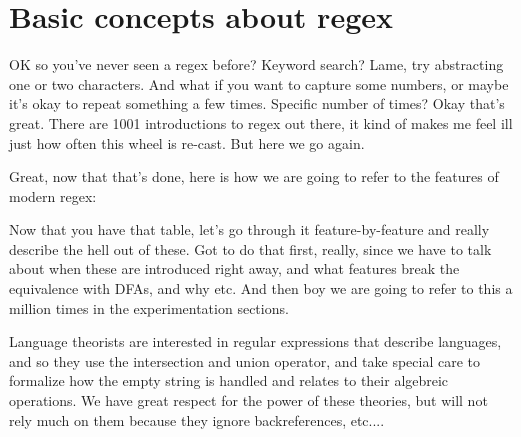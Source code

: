 \section{Basic concepts about regex}


OK so you've never seen a regex before?  Keyword search?  Lame, try abstracting one or two characters.  And what if you want to capture some numbers, or maybe it's okay to repeat something a few times.  Specific number of times?  Okay that's great.  There are 1001 introductions to regex out there, it kind of makes me feel ill just how often this wheel is re-cast. But here we go again.


Great, now that that's done, here is how we are going to refer to the features of modern regex:


Now that you have that table, let's go through it feature-by-feature and really describe the hell out of these.  Got to do that first, really, since we have to talk about when these are introduced right away, and what features break the equivalence with DFAs, and why etc.  And then boy we are going to refer to this a million times in the experimentation sections.

Language theorists are interested in regular expressions that describe languages, and so they use the intersection and union operator, and take special care to formalize how the empty string is handled and relates to their algebreic operations.  We have great respect for the power of these theories, but will not rely much on them because they ignore backreferences, etc....
